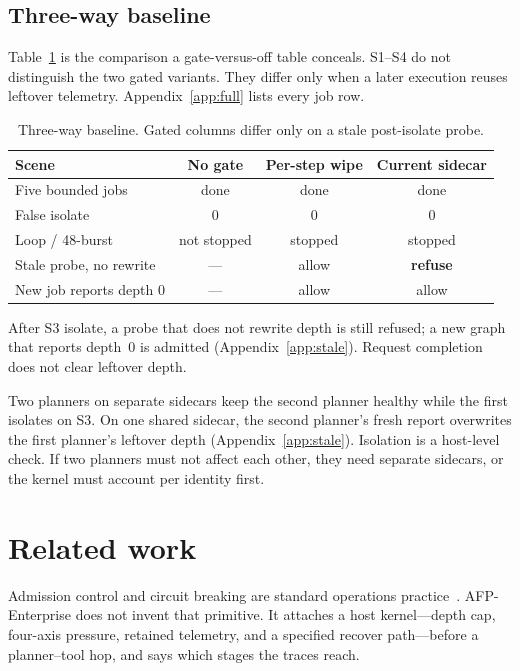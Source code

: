 \documentclass[11pt,a4paper]{article}
\begin{document}
\subsection{Three-way baseline}

Table~\ref{tab:threeway} is the comparison a gate-versus-off table conceals.
S1--S4 do not distinguish the two gated variants.
They differ only when a later execution reuses leftover telemetry.
Appendix~\ref{app:full} lists every job row.

\begin{table}[htbp]
\centering
\caption{Three-way baseline. Gated columns differ only on a stale post-isolate probe.}
\label{tab:threeway}
\begin{tabular}{@{}lccc@{}}
\toprule
Scene & No gate & Per-step wipe & Current sidecar \\
\midrule
Five bounded jobs & done & done & done \\
False isolate & $0$ & $0$ & $0$ \\
Loop / 48-burst & not stopped & stopped & stopped \\
Stale probe, no rewrite & --- & allow & \textbf{refuse} \\
New job reports depth $0$ & --- & allow & allow \\
\bottomrule
\end{tabular}
\end{table}

After S3 isolate, a probe that does not rewrite depth is still refused; a new graph that reports depth~$0$ is admitted (Appendix~\ref{app:stale}).
Request completion does not clear leftover depth.

Two planners on separate sidecars keep the second planner healthy while the first isolates on S3.
On one shared sidecar, the second planner's fresh report overwrites the first planner's leftover depth (Appendix~\ref{app:stale}).
Isolation is a host-level check.
If two planners must not affect each other, they need separate sidecars, or the kernel must account per identity first.

\section{Related work}

Admission control and circuit breaking are standard operations practice~\cite{jacobson1988,welsh2001,nygard2018,fowler2014,envoy2024}.
AFP-Enterprise does not invent that primitive.
It attaches a host kernel---depth cap, four-axis pressure, retained telemetry, and a specified recover path---before a planner--tool hop, and says which stages the traces reach.
\end{document}
